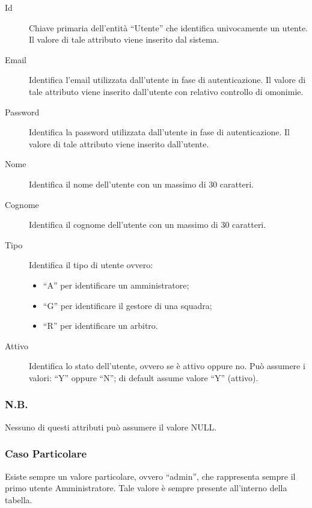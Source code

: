 		\begin{description}
			
			\item[Id]
			Chiave primaria dell'entità ``Utente'' che identifica univocamente un utente. Il valore di tale attributo viene inserito dal sistema.
			
			\item[Email]
			Identifica l'email utilizzata dall'utente in fase di autenticazione. Il valore di tale attributo viene inserito dall'utente con relativo controllo di omonimie.
			
			\item[Password]
			Identifica la password utilizzata dall'utente in fase di autenticazione. Il valore di tale attributo viene inserito dall'utente.
			
			\item[Nome]
			Identifica il nome dell'utente con un massimo di 30 caratteri.
			
			\item[Cognome]
			Identifica il cognome dell'utente con un massimo di 30 caratteri.
			
			\item[Tipo]
			Identifica il tipo di utente ovvero:
			\begin{itemize}
				\item
				``A'' per identificare un amministratore;
				\item
				``G'' per identificare il gestore di una squadra;
				\item
				``R'' per identificare un arbitro.
			\end{itemize}
			
			\item[Attivo]
			Identifica lo stato dell'utente, ovvero se è attivo oppure no. Può assumere i valori: ``Y'' oppure ``N''; di default assume valore ``Y'' (attivo).
			
		\end{description}
		
		\subsubsection*{N.B.}
		Nessuno di questi attributi può assumere il valore NULL.
		
		\subsubsection*{Caso Particolare}
		Esiste sempre un valore particolare, ovvero ``admin'', che rappresenta sempre il primo utente Amministratore. Tale valore è sempre presente all'interno della tabella.
	
